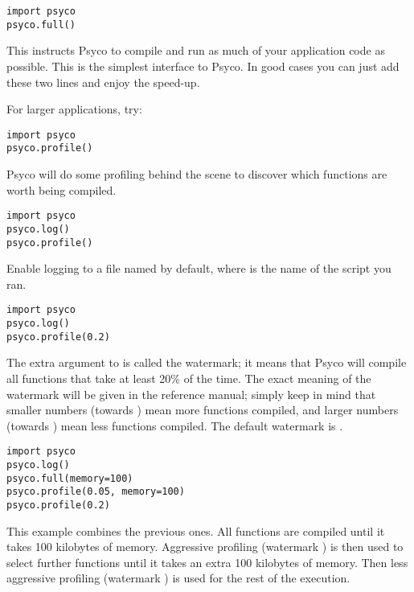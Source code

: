 \documentclass{manual}
\begin{document}
\begin{verbatim}
import psyco
psyco.full()
\end{verbatim}

This instructs Psyco to compile and run as much of your application code as possible.  This is the simplest interface to Psyco.  In good cases you can just add these two lines and enjoy the speed-up.

For larger applications, try:

\begin{verbatim}
import psyco
psyco.profile()
\end{verbatim}

Psyco will do some profiling behind the scene to discover which functions are worth being compiled.

\begin{verbatim}
import psyco
psyco.log()
psyco.profile()
\end{verbatim}

Enable logging to a file named  by default, where  is the name of the script you ran.

\begin{verbatim}
import psyco
psyco.log()
psyco.profile(0.2)
\end{verbatim}

The extra argument  to  is called the watermark; it means that Psyco will compile all functions that take at least 20\% of the time.  The exact meaning of the watermark will be given in the reference manual; simply keep in mind that smaller numbers (towards ) mean more functions compiled, and larger numbers (towards ) mean less functions compiled.  The default watermark is .

\begin{verbatim}
import psyco
psyco.log()
psyco.full(memory=100)
psyco.profile(0.05, memory=100)
psyco.profile(0.2)
\end{verbatim}

This example combines the previous ones.  All functions are compiled until it takes 100 kilobytes of memory.  Aggressive profiling (watermark ) is then used to select further functions until it takes an extra 100 kilobytes of memory.  Then less aggressive profiling (watermark ) is used for the rest of the execution.  
\end{document}
